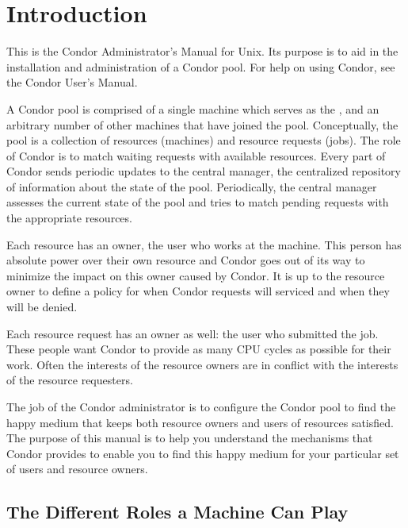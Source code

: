 \section{\label{sec:Admin-Intro}Introduction}

This is the Condor Administrator's Manual for Unix.
Its purpose is to aid in
the installation and administration of a Condor pool.  For help on
using Condor, see the Condor User's Manual.  

A Condor pool
is comprised of a single machine which serves as the
,
and an arbitrary number of other machines that
have joined the pool.  Conceptually, the pool is a collection of
resources (machines) and resource requests (jobs).  The role of Condor
is to match waiting requests with available resources.  Every part of
Condor sends periodic updates to the central manager, the centralized
repository of information about the state of the pool.  Periodically,
the central manager assesses the current state of the pool and tries
to match pending requests with the appropriate resources.  

Each resource has an owner,
the user who works at the machine.  This
person has absolute power over their own resource and Condor goes out
of its way to minimize the impact on this owner caused by Condor.  It
is up to the resource owner to define a policy for when Condor
requests will
serviced and when they will be denied.

Each resource request has an owner as well: the
user who submitted the job.  These people want Condor to provide as
many CPU cycles as possible for their work.  Often the interests of
the resource owners are in conflict with the interests of the resource
requesters.  

The job of the Condor administrator is to configure the Condor pool to
find the happy medium that keeps both resource owners and users of
resources satisfied.  The purpose of this manual is to help you
understand the mechanisms that Condor provides to enable you to find
this happy medium for your particular set of users and resource owners.

\subsection{\label{sec:Machine-Roles}The Different Roles a Machine Can Play}


